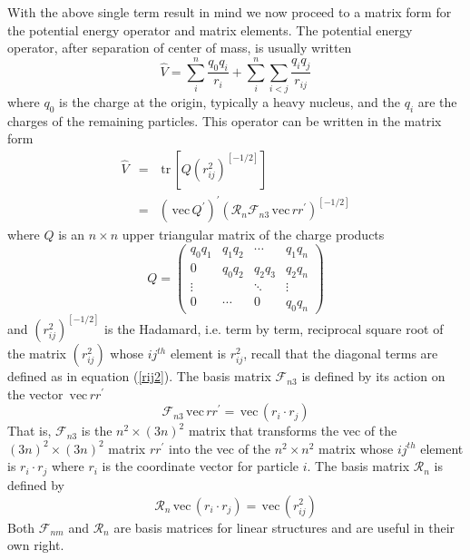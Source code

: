 \documentclass[12pt,thmsa,suthesis,verbatim]{report}
\begin{document}
With the above single term result in mind we now proceed to a matrix form
for the potential energy operator and matrix elements. The potential energy
operator, after separation of center of mass, is usually written 
\begin{equation}
\hat V=\sum_i^n\frac{q_0q_i}{r_i}+\sum_i^n\sum_{i<j}\frac{q_iq_j}{r_{ij}}
\end{equation}
where $q_0$ is the charge at the origin, typically a heavy nucleus, and the $%
q_i$ are the charges of the remaining particles. This operator can be
written in the matrix form 
\begin{eqnarray}
\hat V &=&\,\mathrm{tr}\,\left[ Q\left( r_{ij}^2\right) ^{\left[ -1/2\right]
}\right]  \nonumber \\
&=&\left( \,\mathrm{vec}\,Q^{\prime }\right) ^{\prime }\left( \mathcal{R}_n%
\mathcal{F}_{n3}\,\mathrm{vec}\,rr^{\prime }\right) ^{\left[ -1/2\right] }
\end{eqnarray}
where $Q$ is an $n\times n$ upper triangular matrix of the charge products 
\begin{equation}
Q=\left( 
\begin{array}{cccc}
q_0q_1 & q_1q_2 & \cdots & q_1q_n \\ 
0 & q_0q_2 & q_2q_3 & q_2q_n \\ 
\vdots &  & \ddots & \vdots \\ 
0 & \cdots & 0 & q_0q_n
\end{array}
\right)
\end{equation}
and $\left( r_{ij}^2\right) ^{\left[ -1/2\right] }$ is the Hadamard, i.e.
term by term, reciprocal square root of the matrix $\left( r_{ij}^2\right) $
whose $ij^{th}$ element is $r_{ij}^2$, recall that the diagonal terms are
defined as in equation (\ref{rij2}). The basis matrix $\mathcal{F}_{n3}$ is
defined by its action on the vector $\,\mathrm{vec}\,rr^{\prime }$%
\begin{equation}
\mathcal{F}_{n3}\,\mathrm{vec}\,rr^{\prime }=\,\mathrm{vec}\,\left( r_i\cdot
r_j\right)
\end{equation}
That is, $\mathcal{F}_{n3}$ is the $n^2\times \left( 3n\right) ^2$ matrix
that transforms the vec of the $\left( 3n\right) ^2\times \left( 3n\right)
^2 $ matrix $rr^{\prime }$ into the vec of the $n^2\times n^2$ matrix whose $%
ij^{th}$ element is $r_i\cdot r_j$ where $r_i$ is the coordinate vector for
particle $i$. The basis matrix $\mathcal{R}_n$ is defined by 
\begin{equation}
\mathcal{R}_n\,\mathrm{vec}\,\left( r_i\cdot r_j\right) =\,\mathrm{vec}%
\,\left( r_{ij}^2\right)
\end{equation}
Both $\mathcal{F}_{nm}$ and $\mathcal{R}_n$ are basis matrices for linear
structures and are useful in their own right.
\end{document}
